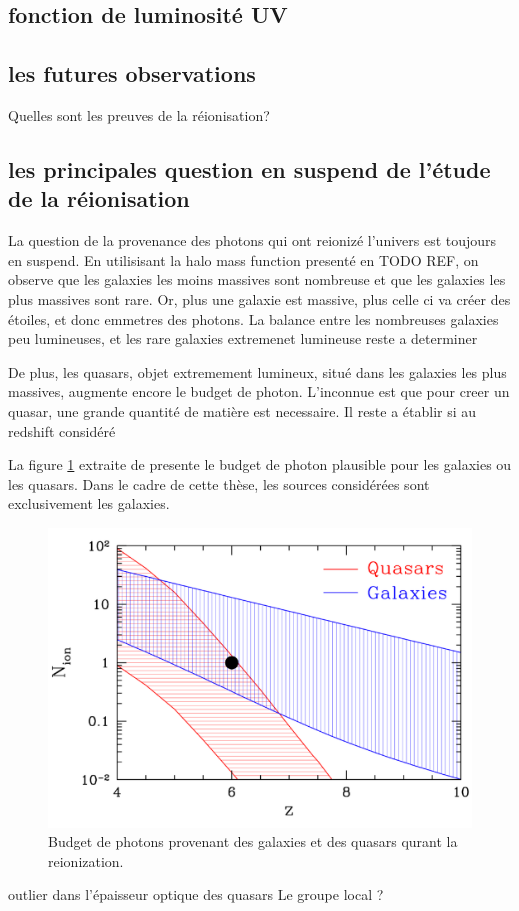 \subsection{fonction de luminosité UV}


\subsection{les futures observations}

Quelles sont les preuves de la réionisation?




\subsection{les principales question en suspend de l'étude de la réionisation}


La question de la provenance des photons qui ont reionizé l'univers est toujours en suspend.
En utilisisant la halo mass function presenté en TODO REF, on observe que les galaxies les moins massives sont nombreuse et que les galaxies les plus massives sont rare.
Or, plus une galaxie est massive, plus celle ci va créer des étoiles, et donc emmetres des photons.
La balance entre les nombreuses galaxies peu lumineuses, et les rare galaxies extremenet lumineuse reste a determiner

De plus, les quasars, objet extremement lumineux, situé dans les galaxies les plus massives, augmente encore le budget de photon.
L'inconnue est que pour creer un quasar, une grande quantité de matière est necessaire.
Il reste a établir si au redshift considéré
\cite{chardin_large-scale_2017}


La figure \ref{fig:gal_AGN} extraite de \cite{trac_computer_2011} presente le budget de photon plausible pour les galaxies ou les quasars.
Dans le cadre de cette thèse, les sources considérées sont exclusivement les galaxies.

\begin{figure}[bth]
        \includegraphics[width=.95\linewidth]{img/01/gal_AGN.pdf} 
        \caption{
        Budget de photons provenant des galaxies et des quasars qurant la reionization.
}
 		\label{fig:gal_AGN}
\end{figure}

outlier dans l'épaisseur optique des quasars
Le groupe local ?
